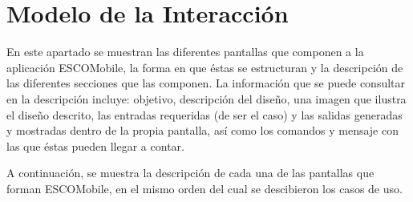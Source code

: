 \documentclass[oneside,10pt]{book}
\begin{document}





\chapter{Modelo de la Interacción}

\noindent
En este apartado se muestran las diferentes pantallas que componen a la aplicación ESCOMobile,
la forma en que éstas se estructuran y la descripción de las diferentes secciones que las componen.
La información que se puede consultar en la descripción incluye: objetivo, descripción del diseño, 
una imagen que ilustra el diseño descrito, las entradas requeridas (de ser el caso) y las salidas
generadas y mostradas dentro de la propia pantalla, así como los comandos y mensaje con las que
éstas pueden llegar a contar.

\noindent
\newline
A continuación, se muestra la descripción de cada una de las pantallas que forman ESCOMobile,
en el mismo orden del cual se descibieron los casos de uso.





\end{document}
